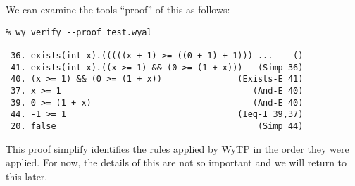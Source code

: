 We can examine the tools ``proof'' of this as follows:
\begin{verbatim}
% wy verify --proof test.wyal

 36. exists(int x).(((((x + 1) >= ((0 + 1) + 1))) ...    () 
 41. exists(int x).((x >= 1) && (0 >= (1 + x)))   (Simp 36) 
 40. (x >= 1) && (0 >= (1 + x))               (Exists-E 41) 
 37. x >= 1                                      (And-E 40) 
 39. 0 >= (1 + x)                                (And-E 40) 
 44. -1 >= 1                                  (Ieq-I 39,37) 
 20. false                                        (Simp 44) 
\end{verbatim}
This proof simplify identifies the rules applied by WyTP in the order
they were applied.  For now, the details of this are not so important
and we will return to this later.
